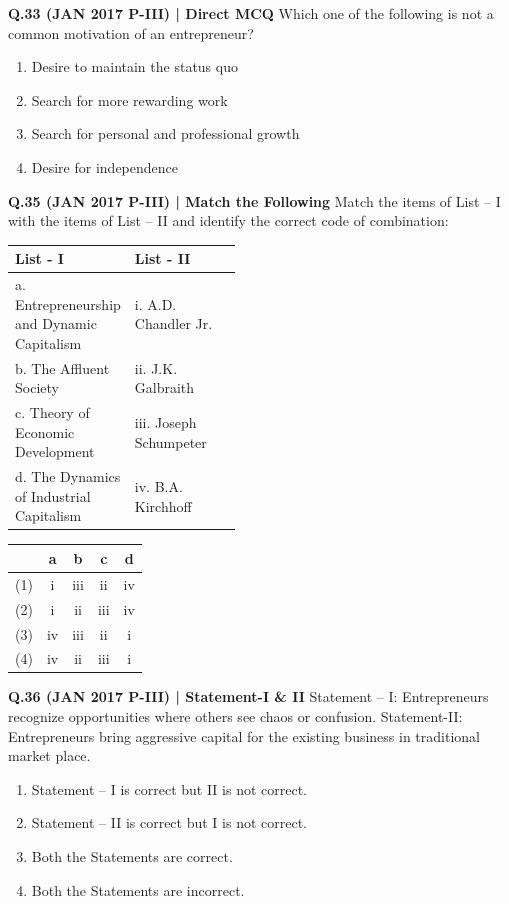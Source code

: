 \documentclass{article}
\begin{document}
\textbf{Q.33 (JAN 2017 P-III) | Direct MCQ}
Which one of the following is not a common motivation of an entrepreneur?
\begin{enumerate}[label=(\arabic*)]
    \item Desire to maintain the status quo
    \item Search for more rewarding work
    \item Search for personal and professional growth
    \item Desire for independence
\end{enumerate}

\textbf{Q.35 (JAN 2017 P-III) | Match the Following}
Match the items of List – I with the items of List – II and identify the correct code of combination:
\begin{tabularx}{\linewidth}{@{} p{0.45\linewidth} X @{}}
    \toprule
    \textbf{List - I} & \textbf{List - II} \\
    \midrule
    a. Entrepreneurship and Dynamic Capitalism   & i. A.D. Chandler Jr. \\
    b. The Affluent Society                     & ii. J.K. Galbraith \\
    c. Theory of Economic Development           & iii. Joseph Schumpeter \\
    d. The Dynamics of Industrial Capitalism    & iv. B.A. Kirchhoff \\
    \bottomrule
\end{tabularx}
\begin{tabularx}{\linewidth}{@{} l *{4}{c} @{}}
    \toprule
    & a    & b    & c    & d \\
    \midrule
    (1)  & i    & iii  & ii   & iv \\
    (2)  & i    & ii   & iii  & iv \\
    (3)  & iv   & iii  & ii   & i \\
    (4)  & iv   & ii   & iii  & i \\
    \bottomrule
\end{tabularx}

\textbf{Q.36 (JAN 2017 P-III) | Statement-I \& II}
Statement – I: Entrepreneurs recognize opportunities where others see chaos or confusion.
Statement-II: Entrepreneurs bring aggressive capital for the existing business in traditional market place.
\begin{enumerate}[label=(\arabic*)]
    \item Statement – I is correct but II is not correct.
    \item Statement – II is correct but I is not correct.
    \item Both the Statements are correct.
    \item Both the Statements are incorrect.
\end{enumerate}
\end{document}
